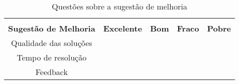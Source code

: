 \begin{table}[htb]
\centering
\caption{Questões sobre a sugestão de melhoria}
\label{my-label}
\begin{tabular}{cl|c|c|c|c|}
\cline{3-6}
\multicolumn{1}{l}{}                           &                            & \cellcolor[HTML]{9AFF99}                                     & \cellcolor[HTML]{9AFF99}                               & \cellcolor[HTML]{9AFF99}                                 & \cellcolor[HTML]{9AFF99}                                 \\ \cline{1-2}
\multicolumn{2}{|c|}{\cellcolor[HTML]{FFFC9E}\textbf{Sugestão de Melhoria}} & \multirow{-2}{*}{\cellcolor[HTML]{9AFF99}\textbf{Excelente}} & \multirow{-2}{*}{\cellcolor[HTML]{9AFF99}\textbf{Bom}} & \multirow{-2}{*}{\cellcolor[HTML]{9AFF99}\textbf{Fraco}} & \multirow{-2}{*}{\cellcolor[HTML]{9AFF99}\textbf{Pobre}} \\ \hline
\multicolumn{2}{|c|}{\cellcolor[HTML]{FFFFC7}Qualidade das soluções}        &                                                              &                                                        &                                                          &                                                          \\ \hline
\multicolumn{2}{|c|}{\cellcolor[HTML]{FFFFC7}Tempo de resolução}            &                                                              &                                                        &                                                          &                                                          \\ \hline
\multicolumn{2}{|c|}{\cellcolor[HTML]{FFFFC7}Feedback}                      &                                                              &                                                        &                                                          &                                                          \\ \hline
\end{tabular}
\end{table}


